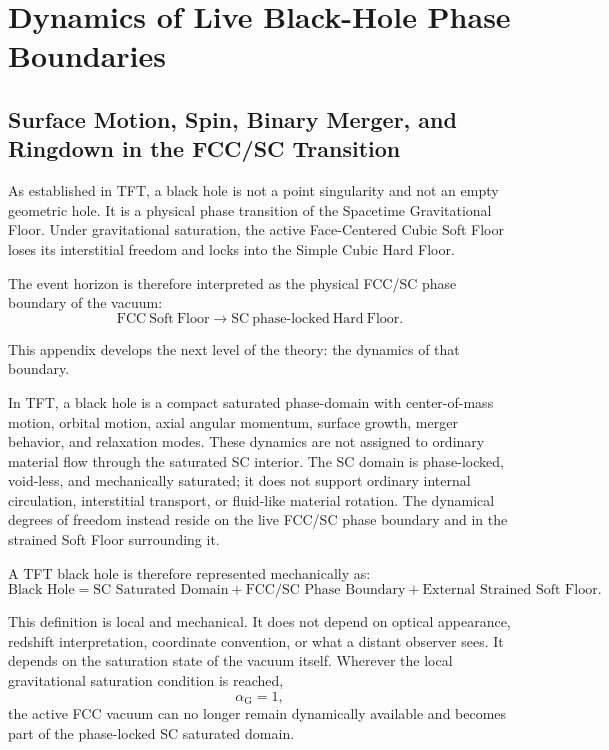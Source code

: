 \chapter{Dynamics of Live Black-Hole Phase Boundaries}
\label{app:live_black_hole_boundaries}

\section*{Surface Motion, Spin, Binary Merger, and Ringdown in the FCC/SC Transition}

As established in TFT, a black hole is not a point singularity and not an empty geometric hole. It is a physical phase transition of the Spacetime Gravitational Floor. Under gravitational saturation, the active Face-Centered Cubic Soft Floor loses its interstitial freedom and locks into the Simple Cubic Hard Floor.

The event horizon is therefore interpreted as the physical FCC/SC phase boundary of the vacuum:
\begin{equation}
    \mathrm{FCC\ Soft\ Floor} \rightarrow \mathrm{SC\ phase\text{-}locked\ Hard\ Floor}.
\end{equation}

This appendix develops the next level of the theory: the dynamics of that boundary.

In TFT, a black hole is a compact saturated phase-domain with center-of-mass motion, orbital motion, axial angular momentum, surface growth, merger behavior, and relaxation modes. These dynamics are not assigned to ordinary material flow through the saturated SC interior. The SC domain is phase-locked, void-less, and mechanically saturated; it does not support ordinary internal circulation, interstitial transport, or fluid-like material rotation. The dynamical degrees of freedom instead reside on the live FCC/SC phase boundary and in the strained Soft Floor surrounding it.

A TFT black hole is therefore represented mechanically as:
\begin{equation}
    \text{Black Hole} = \text{SC Saturated Domain} + \text{FCC/SC Phase Boundary} + \text{External Strained Soft Floor}.
\end{equation}

This definition is local and mechanical. It does not depend on optical appearance, redshift interpretation, coordinate convention, or what a distant observer sees. It depends on the saturation state of the vacuum itself. Wherever the local gravitational saturation condition is reached,
\begin{equation}
    \alpha_{\mathrm{G}} = 1,
\end{equation}
the active FCC vacuum can no longer remain dynamically available and becomes part of the phase-locked SC saturated domain.

